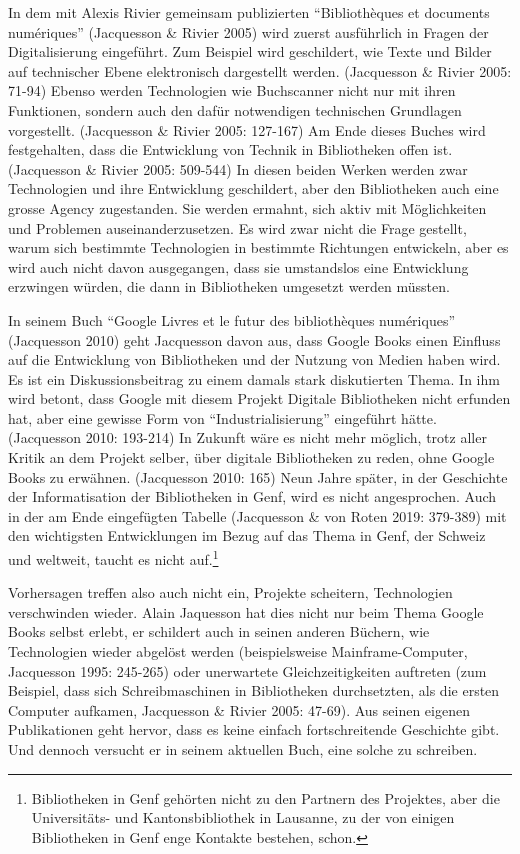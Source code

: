 \documentclass[a4paper,
fontsize=11pt,
oneside,
numbers=noperiodatend,
parskip=half-,
bibliography=totoc,
final
]{scrartcl}
\begin{document}
In dem mit Alexis Rivier gemeinsam publizierten \enquote{Bibliothèques
et documents numériques} (Jacquesson \& Rivier 2005) wird zuerst
ausführlich in Fragen der Digitalisierung eingeführt. Zum Beispiel wird
geschildert, wie Texte und Bilder auf technischer Ebene elektronisch
dargestellt werden. (Jacquesson \& Rivier 2005: 71-94) Ebenso werden
Technologien wie Buchscanner nicht nur mit ihren Funktionen, sondern
auch den dafür notwendigen technischen Grundlagen vorgestellt.
(Jacquesson \& Rivier 2005: 127-167) Am Ende dieses Buches wird
festgehalten, dass die Entwicklung von Technik in Bibliotheken offen
ist. (Jacquesson \& Rivier 2005: 509-544) In diesen beiden Werken werden
zwar Technologien und ihre Entwicklung geschildert, aber den
Bibliotheken auch eine grosse Agency zugestanden. Sie werden ermahnt,
sich aktiv mit Möglichkeiten und Problemen auseinanderzusetzen. Es wird
zwar nicht die Frage gestellt, warum sich bestimmte Technologien in
bestimmte Richtungen entwickeln, aber es wird auch nicht davon
ausgegangen, dass sie umstandslos eine Entwicklung erzwingen würden, die
dann in Bibliotheken umgesetzt werden müssten.

In seinem Buch \enquote{Google Livres et le futur des bibliothèques
numériques} (Jacquesson 2010) geht Jacquesson davon aus, dass Google
Books einen Einfluss auf die Entwicklung von Bibliotheken und der
Nutzung von Medien haben wird. Es ist ein Diskussionsbeitrag zu einem
damals stark diskutierten Thema. In ihm wird betont, dass Google mit
diesem Projekt Digitale Bibliotheken nicht erfunden hat, aber eine
gewisse Form von \enquote{Industrialisierung} eingeführt hätte.
(Jacquesson 2010: 193-214) In Zukunft wäre es nicht mehr möglich, trotz
aller Kritik an dem Projekt selber, über digitale Bibliotheken zu reden,
ohne Google Books zu erwähnen. (Jacquesson 2010: 165) Neun Jahre später,
in der Geschichte der Informatisation der Bibliotheken in Genf, wird es
nicht angesprochen. Auch in der am Ende eingefügten Tabelle (Jacquesson
\& von Roten 2019: 379-389) mit den wichtigsten Entwicklungen im Bezug
auf das Thema in Genf, der Schweiz und weltweit, taucht es nicht
auf.\footnote{Bibliotheken in Genf gehörten nicht zu den Partnern des
  Projektes, aber die Universitäts- und Kantonsbibliothek in Lausanne,
  zu der von einigen Bibliotheken in Genf enge Kontakte bestehen, schon.}

Vorhersagen treffen also auch nicht ein, Projekte scheitern,
Technologien verschwinden wieder. Alain Jaquesson hat dies nicht nur
beim Thema Google Books selbst erlebt, er schildert auch in seinen
anderen Büchern, wie Technologien wieder abgelöst werden (beispielsweise
Mainframe-Computer, Jacquesson 1995: 245-265) oder unerwartete
Gleichzeitigkeiten auftreten (zum Beispiel, dass sich Schreibmaschinen
in Bibliotheken durchsetzten, als die ersten Computer aufkamen,
Jacquesson \& Rivier 2005: 47-69). Aus seinen eigenen Publikationen geht
hervor, dass es keine einfach fortschreitende Geschichte gibt. Und
dennoch versucht er in seinem aktuellen Buch, eine solche zu schreiben.
\end{document}
